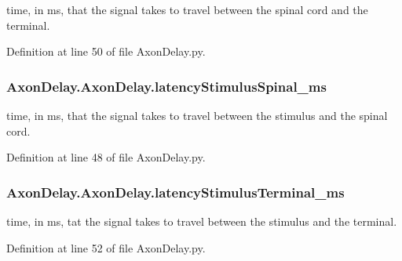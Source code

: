time, in ms, that the signal takes to travel between the spinal cord and the terminal. 



Definition at line 50 of file Axon\+Delay.\+py.

\subsubsection[{\texorpdfstring{latency\+Stimulus\+Spinal\+\_\+ms}{latencyStimulusSpinal_ms}}]{\setlength{\rightskip}{0pt plus 5cm}Axon\+Delay.\+Axon\+Delay.\+latency\+Stimulus\+Spinal\+\_\+ms}\hypertarget{class_axon_delay_1_1_axon_delay_a81ea09febed911b8f5e4d56a5f434f8d}{}\label{class_axon_delay_1_1_axon_delay_a81ea09febed911b8f5e4d56a5f434f8d}


time, in ms, that the signal takes to travel between the stimulus and the spinal cord. 



Definition at line 48 of file Axon\+Delay.\+py.

\subsubsection[{\texorpdfstring{latency\+Stimulus\+Terminal\+\_\+ms}{latencyStimulusTerminal_ms}}]{\setlength{\rightskip}{0pt plus 5cm}Axon\+Delay.\+Axon\+Delay.\+latency\+Stimulus\+Terminal\+\_\+ms}\hypertarget{class_axon_delay_1_1_axon_delay_a88845b9926b97db88174ce088d5af5e0}{}\label{class_axon_delay_1_1_axon_delay_a88845b9926b97db88174ce088d5af5e0}


time, in ms, tat the signal takes to travel between the stimulus and the terminal. 



Definition at line 52 of file Axon\+Delay.\+py.

